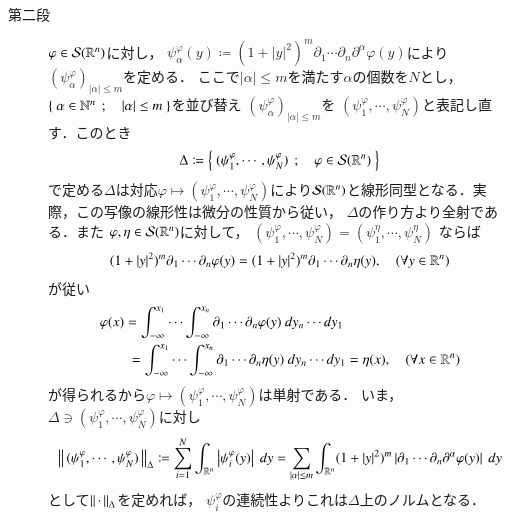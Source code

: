 \begin{prf}
\begin{description}
			\item[第二段]
				$\varphi \in \mathcal{S}(\mathbb{R}^n)$に対し，
				$\psi^\varphi_\alpha(y) \coloneqq (1+|y|^2)^m \partial_1 \cdots \partial_n\partial^\alpha \varphi(y)$により$(\psi^\varphi_\alpha)_{|\alpha| \leq m}$を定める．
				ここで$|\alpha| \leq m$を満たす$\alpha$の個数を$N$とし，
				$\left\{\ \alpha \in \mathbb{N}^n\ \, ; \quad |\alpha| \leq m\ \right\}$を並び替え
				$( \psi^\varphi_\alpha )_{|\alpha| \leq m}$を
				$(\psi^\varphi_1,\cdots,\psi^\varphi_N)$と表記し直す．このとき
				\begin{align}
					\Delta \coloneqq \left\{\ (\psi^\varphi_1,\cdots,\psi^\varphi_N)\ \, ; \quad \varphi \in \mathcal{S}(\mathbb{R}^n)\ \right\}
				\end{align}
				で定める$\Delta$は対応$\varphi \longmapsto (\psi^\varphi_1,\cdots,\psi^\varphi_N)$により$\mathcal{S}(\mathbb{R}^n)$と線形同型となる．実際，この写像の線形性は微分の性質から従い，
				$\Delta$の作り方より全射である．また
				$\varphi,\eta \in \mathcal{S}(\mathbb{R}^n)$に対して，
				$(\psi^\varphi_1,\cdots,\psi^\varphi_N) = (\psi^\eta_1,\cdots,\psi^\eta_N)$
				ならば
				\begin{align}
					(1+|y|^2)^m \partial_1 \cdots \partial_n \varphi(y)
					= (1+|y|^2)^m \partial_1 \cdots \partial_n \eta(y),
					\quad (\forall y \in \mathbb{R}^n)
				\end{align}
				が従い
				\begin{align}
					&\varphi(x)
					= \int_{-\infty}^{x_1}\cdots\int_{-\infty}^{x_n} \partial_1 \cdots \partial_n \varphi(y)\ dy_n\cdots dy_1 \\
					&\qquad = \int_{-\infty}^{x_1}\cdots\int_{-\infty}^{x_n} \partial_1 \cdots \partial_n \eta(y)\ dy_n\cdots dy_1
					= \eta(x),
					\quad (\forall x \in \mathbb{R}^n)
				\end{align}
				が得られるから$\varphi \longmapsto (\psi^\varphi_1,\cdots,\psi^\varphi_N)$は単射である．
				いま，$\Delta \ni (\psi^\varphi_1,\cdots,\psi^\varphi_N)$に対し
				\begin{align}
					\Norm{(\psi^\varphi_1,\cdots,\psi^\varphi_N)}{\Delta}
					\coloneqq \sum_{i=1}^{N} \int_{\R^n} \left| \psi^\varphi_i(y) \right|\ dy
					= \sum_{|\alpha| \leq m} \int_{\R^n} (1+|y|^2)^m \left| \partial_1 \cdots \partial_n\partial^\alpha \varphi(y) \right|\ dy
					\label{eq:structure_theorem_of_tempered_distributions_2}
				\end{align}
				として$\left\|\, \cdot\, \right\|_{\Delta}$を定めれば，
				$\psi^\varphi_i$の連続性よりこれは$\Delta$上のノルムとなる．
				

\end{description}
\end{prf}

